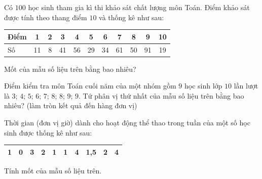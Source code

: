 \begin{bt}%
	Có $100$ học sinh tham gia  kì thi khảo sát chất lượng môn Toán. Điểm khảo sát được tính theo thang điểm $10$ và thống kê như sau:
	\begin{center}
		\begin{tabular}{|l|c|c|c|c|c|c|c|c|c|c|}
			\hline Điểm & 1 & 2 & 3 & 4 &  5 & 6 & 7 & 8 & 9 & 10 \\
			\hline Số & 11 & 8 &  41 & 56 & 29 & 34 & 61 & 50 & 91 & 19 \\
			\hline 
		\end{tabular}
	\end{center}
	Mốt  của mẫu số liệu trên bằng bao nhiêu?
\end{bt}

\begin{bt}%
	Điểm kiểm tra môn Toán cuối năm của một nhóm gồm $9$ học sinh lớp $10$ lần lượt là $3$; $4$; $5$; $6$; $7$; $8$; $8$; $9$; $9$. Tứ phân vị thứ nhất của mẫu số liệu trên bằng bao nhiêu? (làm  tròn kết quả đến hàng đơn vị)
\end{bt}

\begin{bt}%
	Thời gian (đơn vị giờ) dành cho hoạt động thể thao trong  tuần của một số học sinh được thống kê như sau:
	\begin{center}
		\begin{tabular}{|l|l|l|l|l|l|l|l|l|l|}
			\hline 1 & 0 & 3 & 2 & 1 & 1 & 4 & 1,5 & 2 & 4  \\
			 \hline
		\end{tabular}
	\end{center}
	Tính mốt của mẫu số liệu trên. 
\end{bt}

